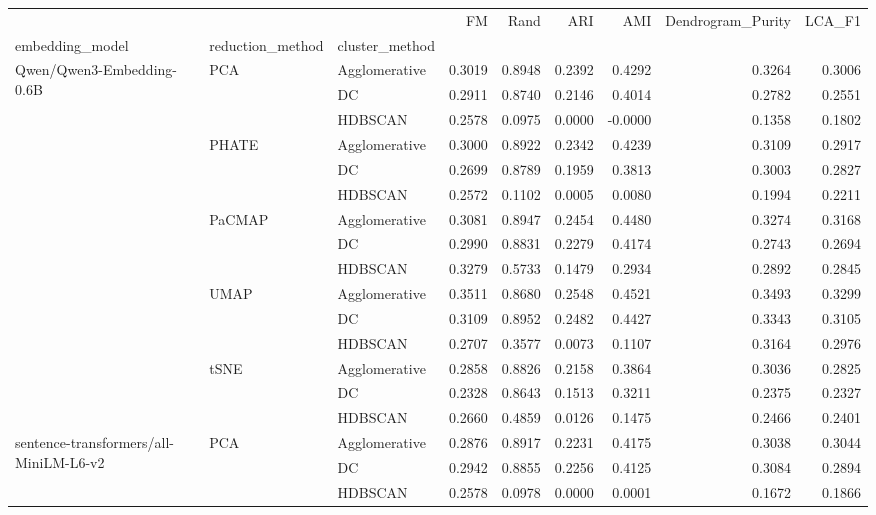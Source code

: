 \begin{tabular}{lllrrrrrr}
\toprule
 &  &  & FM & Rand & ARI & AMI & Dendrogram_Purity & LCA_F1 \\
embedding_model & reduction_method & cluster_method &  &  &  &  &  &  \\
\midrule
\multirow[t]{15}{*}{Qwen/Qwen3-Embedding-0.6B} & \multirow[t]{3}{*}{PCA} & Agglomerative & 0.3019 & 0.8948 & 0.2392 & 0.4292 & 0.3264 & 0.3006 \\
 &  & DC & 0.2911 & 0.8740 & 0.2146 & 0.4014 & 0.2782 & 0.2551 \\
 &  & HDBSCAN & 0.2578 & 0.0975 & 0.0000 & -0.0000 & 0.1358 & 0.1802 \\
\cline{2-9}
 & \multirow[t]{3}{*}{PHATE} & Agglomerative & 0.3000 & 0.8922 & 0.2342 & 0.4239 & 0.3109 & 0.2917 \\
 &  & DC & 0.2699 & 0.8789 & 0.1959 & 0.3813 & 0.3003 & 0.2827 \\
 &  & HDBSCAN & 0.2572 & 0.1102 & 0.0005 & 0.0080 & 0.1994 & 0.2211 \\
\cline{2-9}
 & \multirow[t]{3}{*}{PaCMAP} & Agglomerative & 0.3081 & 0.8947 & 0.2454 & 0.4480 & 0.3274 & 0.3168 \\
 &  & DC & 0.2990 & 0.8831 & 0.2279 & 0.4174 & 0.2743 & 0.2694 \\
 &  & HDBSCAN & 0.3279 & 0.5733 & 0.1479 & 0.2934 & 0.2892 & 0.2845 \\
\cline{2-9}
 & \multirow[t]{3}{*}{UMAP} & Agglomerative & 0.3511 & 0.8680 & 0.2548 & 0.4521 & 0.3493 & 0.3299 \\
 &  & DC & 0.3109 & 0.8952 & 0.2482 & 0.4427 & 0.3343 & 0.3105 \\
 &  & HDBSCAN & 0.2707 & 0.3577 & 0.0073 & 0.1107 & 0.3164 & 0.2976 \\
\cline{2-9}
 & \multirow[t]{3}{*}{tSNE} & Agglomerative & 0.2858 & 0.8826 & 0.2158 & 0.3864 & 0.3036 & 0.2825 \\
 &  & DC & 0.2328 & 0.8643 & 0.1513 & 0.3211 & 0.2375 & 0.2327 \\
 &  & HDBSCAN & 0.2660 & 0.4859 & 0.0126 & 0.1475 & 0.2466 & 0.2401 \\
\cline{1-9} \cline{2-9}
\multirow[t]{15}{*}{sentence-transformers/all-MiniLM-L6-v2} & \multirow[t]{3}{*}{PCA} & Agglomerative & 0.2876 & 0.8917 & 0.2231 & 0.4175 & 0.3038 & 0.3044 \\
 &  & DC & 0.2942 & 0.8855 & 0.2256 & 0.4125 & 0.3084 & 0.2894 \\
 &  & HDBSCAN & 0.2578 & 0.0978 & 0.0000 & 0.0001 & 0.1672 & 0.1866 \\

\end{tabular}
